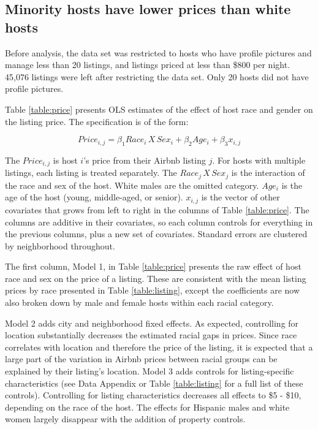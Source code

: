 \subsection{Minority hosts have lower prices than white hosts} 
	\label{result1}
Before analysis, the data set was restricted to hosts who have profile pictures and manage less than 20 listings, and listings priced at less than \$800 per night. 45,076 listings were left after restricting the data set. Only 20 hosts did not have profile pictures.

Table \ref{table:price} presents OLS estimates of the effect of host race and gender on the listing price. The specification is of the form: 

\[ Price_{i,j} = \beta_1 Race_{i}\,X \,Sex_i + \beta_2 Age_i + \beta_3 x_{i,j}\]

The $Price_{i,j}$ is host $i$'s price from their Airbnb listing $j$. For hosts with multiple listings, each listing is treated separately. The $Race_{j}\,X \,Sex_j$ is the interaction of the race and sex of the host. White males are the omitted category. $Age_i$ is the age of the host (young, middle-aged, or senior). $x_{i,j}$ is the vector of other covariates that grows from left to right in the columns of Table \ref{table:price}. The columns are additive in their covariates, so each column controls for everything in the previous columns, plus a new set of covariates. Standard errors are clustered by neighborhood throughout.

The first column, Model 1, in Table \ref{table:price} presents the raw effect of host race and sex on the price of a listing. These are consistent with the mean listing prices by race presented in Table \ref{table:listing}, except the coefficients are now also broken down by male and female hosts within each racial category.

Model 2 adds city and neighborhood fixed effects. As expected, controlling for location substantially decreases the estimated racial gaps in prices. Since race correlates with location and therefore the price of the listing, it is expected that a large part of the variation in Airbnb prices between racial groups can be explained by their listing's location. Model 3 adds controls for listing-specific characteristics (see Data Appendix or Table \ref{table:listing} for a full list of these controls). Controlling for listing characteristics decreases all effects to \$5 - \$10, depending on the race of the host. The effects for Hispanic males and white women largely disappear with the addition of property controls. 

